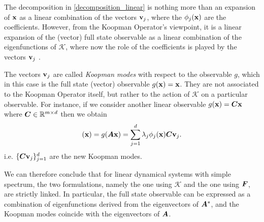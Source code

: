 The decomposition in \eqref{decomposition_linear} is nothing more than an expansion of $\vb{x}$ as a linear combination of the vectors $\vb{v}_j$, where the $\phi_j(\vb{x})$ are the coefficients. However, from the Koopman Operator's viewpoint, it is a linear expansion of the (vector) full state observable as a linear combination of the eigenfunctions of $\mathcal{K}$, where now the role of the coefficients is played by the vectors $\vb{v}_j$ \cite{rowley_spectral_2009}. 

The vectors $\vb{v}_j$ are called \emph{Koopman modes} with respect to the observable $g$, which in this case is the full state (vector) observable $g(\vb{x}) = \vb{x}$. They are not associated to the Koopman Operator itself, but rather to the action of $\mathcal{K}$ on a particular observable. For instance, if we consider another linear observable $g(\vb{x}) = \vb*{C}\vb{x}$ where $\vb*{C}\in\mathbb{R}^{m \times d}$ then we obtain
\begin{equation*}
	[\mathcal{K}g](\vb{x}) = g(\vb*{A}\vb{x})  = \sum_{j=1}^d \lambda_j \phi_j(\vb{x}) \vb*{C}\vb{v}_j.
\end{equation*}
i.e. $\{\vb*{C}\vb{v}_j\}_{j = 1}^d$ are the new Koopman modes.

We can therefore conclude that for linear dynamical systems with simple spectrum, the two formulations, namely the one using $\mathcal{K}$ and the one using $\vb*{F}$, are strictly linked. In particular, the full state observable can be expressed as a combination of eigenfunctions derived from the eigenvectors of $\vb*{A}^*$, and the Koopman modes coincide with the eigenvectors of $\vb*{A}$. 

